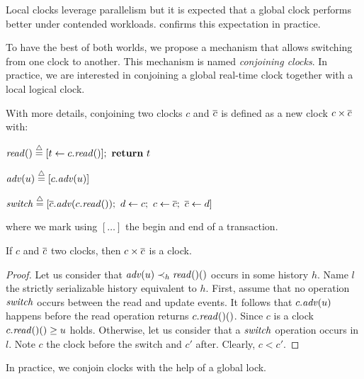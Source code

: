 Local clocks leverage parallelism but it is expected that a global clock performs better under contended workloads.
 confirms this expectation in practice.

To have the best of both worlds, we propose a mechanism that allows switching from one clock to another.
This mechanism is named \emph{conjoining clocks}.
In practice, we are interested in conjoining a global real-time clock together with a local logical clock.

With more details, conjoining two clocks $c$ and $\barc$ is defined as a new clock $c \times \barc$ with:
\begin{compactitem}
\item $\cread \equaldef [t \assign c.\cread];~\text{\textbf{return}}~t$
\item $\cadv(u) \equaldef [c.\cadv(u)]$
\item $\cswitch \equaldef [\barc.\cadv(c.\cread);~d \assign c;~c \assign \barc;~\barc \assign d]$
\end{compactitem}
where we mark using $[ \ldots ]$ the begin and end of a transaction.

\begin{proposition}
  If $c$ and $\barc$ two clocks, then $c \times \barc$ is a clock.
\end{proposition}

\begin{proof}  
  Let us consider that $\cadv(u) \hb_h \cread()$ occurs in some history $h$.
  Name $l$ the strictly serializable history equivalent to $h$.
  First, assume that no operation $\cswitch$ occurs between the read and update events.
  It follows that $c.\cadv(u)$ happens before the read operation returns $c.\cread()$.
  Since $c$ is a clock $c.\cread() \geq u$ holds.
  Otherwise, let us consider that a $\cswitch$ operation occurs in $l$.
  Note $c$ the clock before the switch and $c'$ after.
  Clearly, $c < c'$.
  
\end{proof}

In practice, we conjoin clocks with the help of a global lock.

